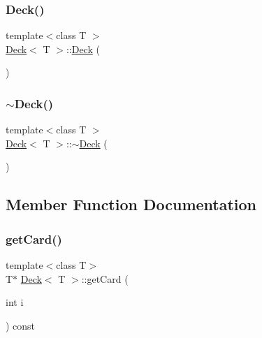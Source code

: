 \subsubsection{\texorpdfstring{Deck()}{Deck()}}
{\footnotesize\ttfamily template$<$class T $>$ \\
\mbox{\hyperlink{class_deck}{Deck}}$<$ T $>$\+::\mbox{\hyperlink{class_deck}{Deck}} (\begin{DoxyParamCaption}{ }\end{DoxyParamCaption})}

\mbox{\label{class_deck_ab3294d971f9ecf25fd92d982aa2efad9}} 
\subsubsection{\texorpdfstring{$\sim$\+Deck()}{~Deck()}}
{\footnotesize\ttfamily template$<$class T $>$ \\
\mbox{\hyperlink{class_deck}{Deck}}$<$ T $>$\+::$\sim$\mbox{\hyperlink{class_deck}{Deck}} (\begin{DoxyParamCaption}{ }\end{DoxyParamCaption})}



\subsection{Member Function Documentation}
\mbox{\label{class_deck_a66c6921f4ecf8c1b8653e9c4b787c150}} 
\subsubsection{\texorpdfstring{get\+Card()}{getCard()}}
{\footnotesize\ttfamily template$<$class T$>$ \\
T$\ast$ \mbox{\hyperlink{class_deck}{Deck}}$<$ T $>$\+::get\+Card (\begin{DoxyParamCaption}\item[{int}]{i }\end{DoxyParamCaption}) const\hspace{0.3cm}{\ttfamily [inline]}}

\mbox{\label{class_deck_ae5cf657c1089ee0d88606c7e63feeb5d}} 

